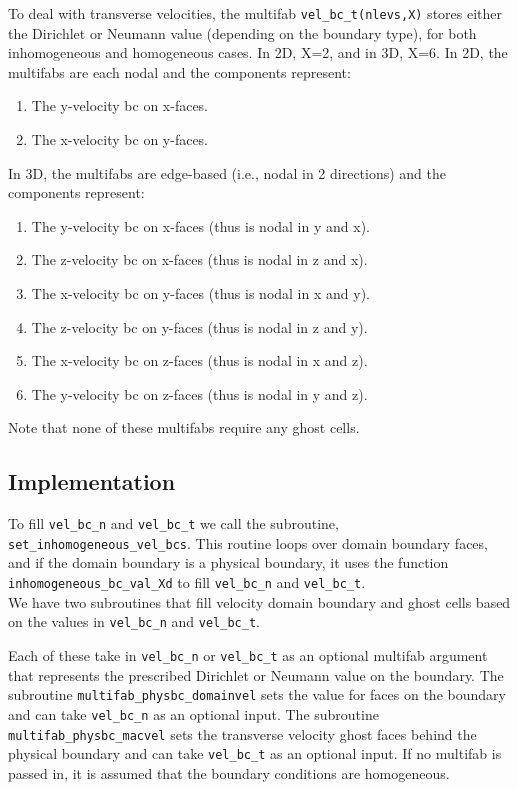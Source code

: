 \documentclass[final]{siamltex}
\begin{document}
To deal with transverse velocities, the multifab {\tt vel\_bc\_t(nlevs,X)} stores
either the Dirichlet or Neumann value (depending on the boundary type), for both 
inhomogeneous and homogeneous cases.  In 2D, X=2,
and in 3D, X=6.  In 2D, the multifabs are each nodal and the components represent:\\
\begin{enumerate}
\item The y-velocity bc on x-faces.
\item The x-velocity bc on y-faces.\\
\end{enumerate}

In 3D, the multifabs are edge-based (i.e., nodal in 2 directions)
and the components represent:\\
\begin{enumerate}
\item The y-velocity bc on x-faces (thus is nodal in y and x).
\item The z-velocity bc on x-faces (thus is nodal in z and x).
\item The x-velocity bc on y-faces (thus is nodal in x and y).
\item The z-velocity bc on y-faces (thus is nodal in z and y).
\item The x-velocity bc on z-faces (thus is nodal in x and z).
\item The y-velocity bc on z-faces (thus is nodal in y and z).\\
\end{enumerate}

Note that none of these multifabs require any ghost cells.\\

\subsection{Implementation}

To fill {\tt vel\_bc\_n} and {\tt vel\_bc\_t} we call the subroutine,
{\tt set\_inhomogeneous\_vel\_bcs}.  This routine loops over domain boundary
faces, and if the domain boundary is a physical boundary, it uses the
function {\tt inhomogeneous\_bc\_val\_Xd} to fill {\tt vel\_bc\_n} and 
{\tt vel\_bc\_t}.\\

We have two subroutines that fill velocity domain boundary and ghost cells based
on the values in {\tt vel\_bc\_n} and {\tt vel\_bc\_t}.

Each of these take in {\tt vel\_bc\_n} or {\tt vel\_bc\_t} as
an optional multifab argument that represents the prescribed Dirichlet
or Neumann value on the boundary.  
The subroutine {\tt multifab\_physbc\_domainvel} sets the 
value for faces on the boundary and can take {\tt vel\_bc\_n} as an optional input.
The subroutine {\tt multifab\_physbc\_macvel}
sets the transverse velocity ghost faces behind the physical boundary and
can take {\tt vel\_bc\_t} as an optional input.
If no multifab is passed in, it is assumed that the boundary conditions
are homogeneous.\\
\end{document}

